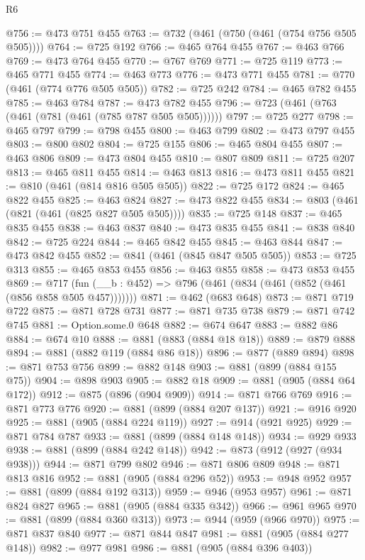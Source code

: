 \begin{lexlean}{R6}
\begin{coremodule}
@756 := @473 @751 @455
@763 := @732 (@461 (@750 (@461 (@754 @756 @505 @505))))
@764 := @725 @192
@766 := @465 @764 @455
@767 := @463 @766
@769 := @473 @764 @455
@770 := @767 @769
@771 := @725 @119
@773 := @465 @771 @455
@774 := @463 @773
@776 := @473 @771 @455
@781 := @770 (@461 (@774 @776 @505 @505))
@782 := @725 @242
@784 := @465 @782 @455
@785 := @463 @784
@787 := @473 @782 @455
@796 := @723 (@461 (@763 (@461 (@781 (@461 (@785 @787 @505 @505))))))
@797 := @725 @277
@798 := @465 @797
@799 := @798 @455
@800 := @463 @799
@802 := @473 @797 @455
@803 := @800 @802
@804 := @725 @155
@806 := @465 @804 @455
@807 := @463 @806
@809 := @473 @804 @455
@810 := @807 @809
@811 := @725 @207
@813 := @465 @811 @455
@814 := @463 @813
@816 := @473 @811 @455
@821 := @810 (@461 (@814 @816 @505 @505))
@822 := @725 @172
@824 := @465 @822 @455
@825 := @463 @824
@827 := @473 @822 @455
@834 := @803 (@461 (@821 (@461 (@825 @827 @505 @505))))
@835 := @725 @148
@837 := @465 @835 @455
@838 := @463 @837
@840 := @473 @835 @455
@841 := @838 @840
@842 := @725 @224
@844 := @465 @842 @455
@845 := @463 @844
@847 := @473 @842 @455
@852 := @841 (@461 (@845 @847 @505 @505))
@853 := @725 @313
@855 := @465 @853 @455
@856 := @463 @855
@858 := @473 @853 @455
@869 := @717 (fun (__b : @452) => @796 (@461 (@834 (@461 (@852 (@461 (@856 @858 @505 @457)))))))
@871 := @462 (@683 @648)
@873 := @871 @719 @722
@875 := @871 @728 @731
@877 := @871 @735 @738
@879 := @871 @742 @745
@881 := Option.some.{0} @648
@882 := @674 @647
@883 := @882 @86
@884 := @674 @10
@888 := @881 (@883 (@884 @18 @18))
@889 := @879 @888
@894 := @881 (@882 @119 (@884 @86 @18))
@896 := @877 (@889 @894)
@898 := @871 @753 @756
@899 := @882 @148
@903 := @881 (@899 (@884 @155 @75))
@904 := @898 @903
@905 := @882 @18
@909 := @881 (@905 (@884 @64 @172))
@912 := @875 (@896 (@904 @909))
@914 := @871 @766 @769
@916 := @871 @773 @776
@920 := @881 (@899 (@884 @207 @137))
@921 := @916 @920
@925 := @881 (@905 (@884 @224 @119))
@927 := @914 (@921 @925)
@929 := @871 @784 @787
@933 := @881 (@899 (@884 @148 @148))
@934 := @929 @933
@938 := @881 (@899 (@884 @242 @148))
@942 := @873 (@912 (@927 (@934 @938)))
@944 := @871 @799 @802
@946 := @871 @806 @809
@948 := @871 @813 @816
@952 := @881 (@905 (@884 @296 @52))
@953 := @948 @952
@957 := @881 (@899 (@884 @192 @313))
@959 := @946 (@953 @957)
@961 := @871 @824 @827
@965 := @881 (@905 (@884 @335 @342))
@966 := @961 @965
@970 := @881 (@899 (@884 @360 @313))
@973 := @944 (@959 (@966 @970))
@975 := @871 @837 @840
@977 := @871 @844 @847
@981 := @881 (@905 (@884 @277 @148))
@982 := @977 @981
@986 := @881 (@905 (@884 @396 @403))

\end{coremodule}
\end{lexlean}
